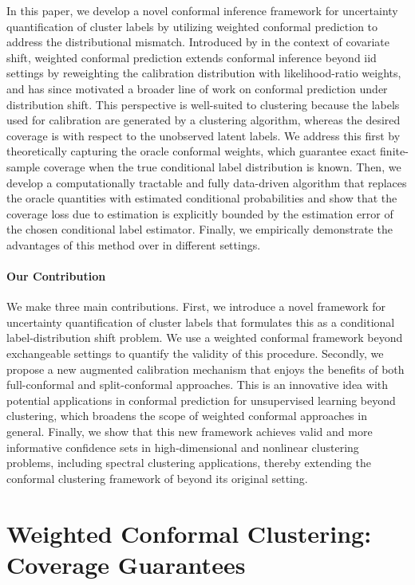 \documentclass[11pt,letterpaper]{article}
\theoremstyle{definition}
\begin{document}
In this paper, we develop a novel conformal inference framework for uncertainty quantification of cluster labels by utilizing weighted conformal prediction to address the distributional mismatch. Introduced by \cite{tibshirani2019conformal} in the context of covariate shift, weighted conformal prediction extends conformal inference beyond iid settings by reweighting the calibration distribution with likelihood-ratio weights, and has since motivated a broader line of work on conformal prediction under distribution shift. This perspective is well-suited to clustering because the labels used for calibration are generated by a clustering algorithm, whereas the desired coverage is with respect to the unobserved latent labels. We address this first by theoretically capturing the oracle conformal weights, which guarantee exact finite-sample coverage when the true conditional label distribution is known. Then, we develop a computationally tractable and fully data-driven algorithm that replaces the oracle quantities with estimated conditional probabilities and show that the coverage loss due to estimation is explicitly bounded by the estimation error of the chosen conditional label estimator. Finally, we empirically demonstrate the advantages of this method over \cite{hur2026inference} in different settings.

\paragraph{Our Contribution} We make three main contributions. First, we introduce a novel framework for uncertainty quantification of cluster labels that formulates this as a conditional label-distribution shift problem. We use a weighted conformal framework beyond exchangeable settings to quantify the validity of this procedure. Secondly, we propose a new augmented calibration mechanism that enjoys the benefits of both full-conformal and split-conformal approaches. This is an innovative idea with potential applications in conformal prediction for unsupervised learning beyond clustering, which broadens the scope of weighted conformal approaches in general. Finally, we show that this new framework achieves valid and more informative confidence sets in high-dimensional and nonlinear clustering problems, including spectral clustering applications, thereby extending the conformal clustering framework of \cite{hur2026inference} beyond its original setting.


\section{Weighted Conformal Clustering: Coverage Guarantees}
\end{document}
